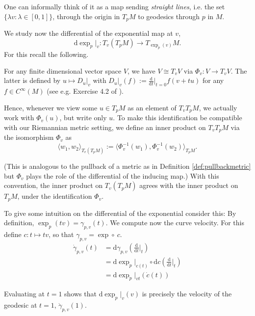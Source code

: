     

One can informally think of it as a map sending \emph{straight lines}, i.e. the set $\{\lambda v: \lambda \in [0,1]\}$, through the origin in $T_p M$ to geodesics through $p$ in $M$.



We study now the differential of the exponential map at $v$,
$$\mathrm{d} \exp_p\big|_v : T_v(T_p M) \to T_{\exp_p(v)} M.$$
For this recall the following.


For any finite dimensional vector space $V$, we have $V\cong T_v V$ via $\Phi_v:V\to T_vV$. The latter is defined by $u\mapsto$$D_u|_v$ with $D_u|_v(f):= \frac{\mathrm{d}}{\mathrm{d}t}\big|_{t=0}f(v+tu)$ for any $f\in C^\infty(M)$ (see e.g. Exercise 4.2 of \cite{tsakanikas2024dg2}). 


Hence, whenever we view some $u\in T_pM$ as an element of $T_vT_pM$, we actually work with $\Phi_v(u)$, but write only $u$. To make this identification be compatible with our Riemannian metric setting, we define an inner product on $T_vT_pM$ via the isomorphism $\Phi_v$ as
$$\langle w_1, w_2 \rangle_{T_v(T_p M)} := \langle \Phi_v^{-1}(w_1), \Phi_v^{-1}(w_2) \rangle_{T_p M}.$$

(This is analogous to the pullback of a metric as in Definition \ref{def:pullbackmetric} but $\Phi_v$ plays the role of the differential of the inducing map.) With this convention, the inner product on $T_v(T_p M)$ agrees with the inner product on $T_p M$, under the identification $\Phi_v$. 

To give some intuition on the differential of the exponential consider this: By definition, $\exp_p(tv)=\gamma_{p,v}(t)$. We compute now the curve velocity. For this define $c:t\mapsto tv$, so that $\gamma_{p,v}=\exp\circ\ c$.
\begin{align*}
    \dot\gamma_{p,v}(t)
    &= \mathrm{d} \gamma_{p,v} \left ( \frac{\mathrm{d}}{\mathrm{d}t}\bigg|_t \right )\\
    &=\mathrm{d} \exp_p|_{c(t)} \circ \mathrm{d} c\left ( \frac{\mathrm{d}}{\mathrm{d}t}\bigg|_t \right )\\
    &=\mathrm{d} \exp_p|_{vt}\left ( \dot c (t)\right )
\end{align*}


Evaluating at $t=1$ shows that $\mathrm{d} \exp_p|_{v}\left ( v\right )$ is precisely the velocity of the geodesic at $t=1$, $\dot\gamma_{p,v}(1)$.\\






